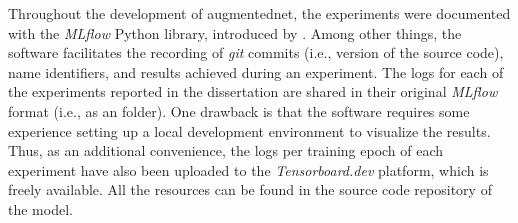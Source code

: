 
Throughout the development of \gls{augmentednet}, the
experiments were documented with the \emph{MLflow} Python
library, introduced by \textcite{zaharia2018accelerating}.
Among other things, the software facilitates the recording
of \emph{git} commits
(i.e., version of the source code), name identifiers, and
results achieved during an experiment. The logs for each of
the experiments reported in the dissertation are shared in
their original \emph{MLflow} format (i.e., as an
 folder). One drawback is that the software
requires some experience setting up a local development
environment to visualize the results. Thus, as an additional
convenience, the logs per training epoch of each experiment
have also been uploaded to the
\emph{Tensorboard.dev}
platform, which is
freely available. All the resources can be found in the
source code repository of the model.

